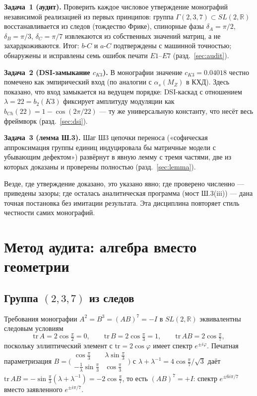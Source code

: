 \documentclass[11pt,a4paper]{article}
\theoremstyle{plain}
\theoremstyle{definition}
\theoremstyle{remark}
\begin{document}
\textbf{Задача~1 (аудит).} Проверить каждое числовое утверждение монографий
независимой реализацией из первых принципов: группа $\Gamma(2,3,7)\subset
SL(2,\mathbb R)$ восстанавливается из следов (тождество Фрике), спинорные фазы
$\delta_A=\pi/2$, $\delta_B=\pi/3$, $\delta_C=\pi/7$ извлекаются из собственных
значений матриц, а не захардкоживаются. Итог: $b\text{-}C$ и $a\text{-}C$
подтверждены с машинной точностью; обнаружены и исправлены семь ошибок печати
$E1$--$E7$ (разд.~\ref{sec:audit}).

\textbf{Задача~2 (DSI-замыкание $c_{K3}$).} В монографии значение
$c_{K3}=0.04018$ честно помечено как эмпирический вход (по аналогии с
$\alpha_s(M_Z)$ в КХД). Здесь показано, что вход замыкается на ведущем порядке:
DSI-каскад с отношением $\lambda=22=b_2(K3)$ фиксирует амплитуду модуляции как
$b_{Ch}(22)=1-\cos(2\pi/22)$ --- ту же универсальную константу, что несёт весь
фреймворк (разд.~\ref{sec:dsi}).

\textbf{Задача~3 (лемма Ш.3).} Шаг Ш3 цепочки переноса («софическая
аппроксимация группы единиц индуцировала бы матричные модели с убывающим
дефектом») развёрнут в явную лемму с тремя частями, две из которых доказаны и
проверены полностью (разд.~\ref{sec:lemma}).

\begin{honestybox}
Везде, где утверждение доказано, это указано явно; где проверено численно ---
приведены зазоры; где осталась аналитическая программа (мост Ш.3(iii)) ---
дана точная постановка без имитации результата. Эта дисциплина повторяет
стиль честности самих монографий.
\end{honestybox}

\section{Метод аудита: алгебра вместо геометрии}\label{sec:method}

\subsection{Группа $(2,3,7)$ из следов}

Требования монографии $A^2=B^3=(AB)^7=-I$ в $SL(2,\mathbb R)$ эквивалентны
следовым условиям
\begin{equation}
  \mathrm{tr}\,A = 2\cos\tfrac{\pi}{2}=0,\qquad
  \mathrm{tr}\,B = 2\cos\tfrac{\pi}{3}=1,\qquad
  \mathrm{tr}\,AB = 2\cos\tfrac{\pi}{7},
\end{equation}
поскольку эллиптический элемент с $\mathrm{tr}=2\cos\varphi$ имеет спектр
$e^{\pm i\varphi}$. Печатная параметризация
$B=\bigl(\begin{smallmatrix}\cos\frac\pi3 & \lambda\sin\frac\pi3\\
-\frac1\lambda\sin\frac\pi3 & \cos\frac\pi3\end{smallmatrix}\bigr)$
с $\lambda+\lambda^{-1}=4\cos\frac\pi7/\sqrt3$ даёт
$\mathrm{tr}\,AB=-\sin\frac\pi3(\lambda+\lambda^{-1})=-2\cos\frac\pi7$, то есть
\emph{$(AB)^7=+I$}: спектр $e^{\pm 6i\pi/7}$ вместо заявленного $e^{\pm i\pi/7}$.
\end{document}
